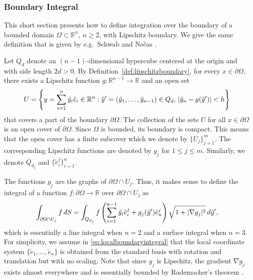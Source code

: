 \documentclass[english, 12pt, a4paper, sci, utf8, a-2b, online]{aaltothesis}
\theoremstyle{definition}
\theoremstyle{plain}
\DeclarePairedDelimiter\abs{\lvert}{\rvert}
\newcommand*\diff{\mathop{}\!d}
\numberwithin{equation}{section}
\begin{document}
\subsubsection{Boundary Integral}
\label{subsubsec:boundaryintegral}

This short section presents how to define integration over the boundary of a bounded domain
$\Omega \subset \mathbb{R}^n$, $n \geq 2$, with Lipschitz boundary.
We give the same definition that is given by e.g.\
Schwab \cite{schwab1998} and Ne{\v c}as \cite{necas2011}.

Let $Q_d$ denote an $(n-1)$-dimensional hypercube centered at the origin
and with side length $2d > 0$. By Definition~\ref{def:lipschitzboundary},
for every $x \in \partial \Omega$, there exists a Lipschitz function
$g: \mathbb{R}^{n-1} \to \mathbb{R}$ and an open set
\begin{equation*}
    U = \left\{ y = \sum_{i=1}^{n} \tilde{y}_i \tilde{e}_i \in \mathbb{R}^n :
        \tilde{y}' = (\tilde{y}_1,\dotsc,\tilde{y}_{n-1}) \in Q_d, \,
        \abs{\tilde{y}_n - g(\tilde{y}')} < h
    \right\}
\end{equation*}
that covers a part of the boundary $\partial \Omega$.
The collection of the sets $U$ for all $x \in \partial \Omega$ is
an open cover of $\partial \Omega$. Since $\Omega$ is bounded, its boundary
is compact. This means that the open cover has a finite subcover which
we denote by $\{ U_j \}_{j=1}^{m}$. The corresponding Lipschitz functions
are denoted by $g_j$ for $1 \leq j \leq m$. Similarly, we denote
$Q_{d_j}$ and $\{ \tilde{e}_i^j \}_{i=1}^{n}$.

The functions $g_j$ are the graphs of $\partial \Omega \cap U_j$.
Thus, it makes sense to define the integral of a function
$f: \partial \Omega \to \mathbb{R}$ over $\partial \Omega \cap U_j$
as
\begin{equation}
    \label{eq:localboundaryintegral}
    \int_{\partial \Omega \cap U_j} f \diff S
    = \int_{Q_{d_j}} f\left( \sum_{i=1}^{n-1} \tilde{y}_i \tilde{e}_i^j + 
        g_j(\tilde{y}') \tilde{e}_n^j \right)
            \sqrt{1 + \abs{\nabla g_j}^2} \diff \tilde{y}',
\end{equation}
which is essentially a line integral when $n=2$ and a surface integral when $n=3$.
For simplicity, we assume in \eqref{eq:localboundaryintegral}
that the local coordinate system $\{ \tilde{e}_1,\dotsc,\tilde{e}_n \}$
is obtained from the standard basis
with rotation and translation but with no scaling.
Note that since $g_j$ is Lipschitz,
the gradient $\nabla g_j$ exists almost everywhere and is essentially bounded
by Rademacher's theorem \cite{schwab1998}.
\end{document}
